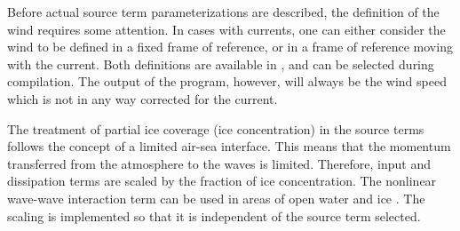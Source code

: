 Before actual source term parameterizations are described, the definition of
the wind requires some attention. In cases with currents, one can either
consider the wind to be defined in a fixed frame of reference, or in a frame
of reference moving with the current. Both definitions are available in \ws,
and can be selected during compilation. The output of the program, however,
will always be the wind speed which is not in any way corrected for the
current.

The treatment of partial ice coverage (ice concentration) in the source terms
follows the concept of a limited air-sea interface. This means that the momentum
transferred from the atmosphere to the waves is limited. Therefore, input and
dissipation terms are scaled by the fraction of ice concentration. The
nonlinear wave-wave interaction term can be used in areas of open water
and ice \citep{art:PL07}. The scaling is implemented so that it is independent
of the source term selected.

